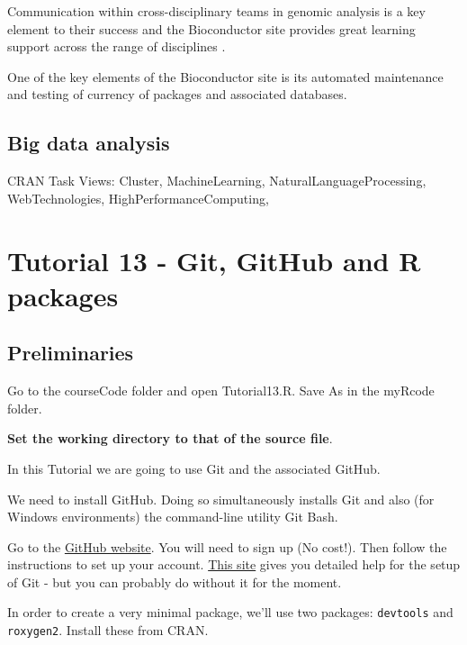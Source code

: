 \documentclass[titlepage]{book}\usepackage{knitr}
\begin{document}
Communication within cross-disciplinary teams in genomic analysis is a key element to their success and the Bioconductor site provides great learning support across the range of disciplines \cite{Huber2015}.

One of the key elements of the Bioconductor site is its automated maintenance and testing of currency of packages and associated databases.  


\section{Big data analysis}
CRAN Task Views: Cluster, MachineLearning, NaturalLanguageProcessing, WebTechnologies, HighPerformanceComputing, 








\chapter{ Tutorial 13 - Git, GitHub and R packages}\label{T13}

\author{Brian Williams $<$\href{mailto:bjw649@gmail.com}%
{bjw649@gmail.com}$>$}

\section{Preliminaries}



Go to the courseCode folder and open Tutorial13.R. Save As in the myRcode folder.

\textbf{Set the working directory to that of the source file}.

In this Tutorial we are going to use Git and the associated GitHub.

We need to install GitHub. Doing so simultaneously installs Git and also (for Windows environments) the command-line utility Git Bash.

Go to the \href{https://GitHub.com/}{GitHub website}. You will need to sign up (No cost!). Then follow the instructions to set up your account. \href{https://help.GitHub.com/articles/set-up-git}{This site} gives you detailed help for the setup of Git - but you can probably do without it for the moment.

In order to create a very minimal package, we'll use two packages: \texttt{devtools} and \texttt{roxygen2}.  Install these from CRAN.
\end{document}
